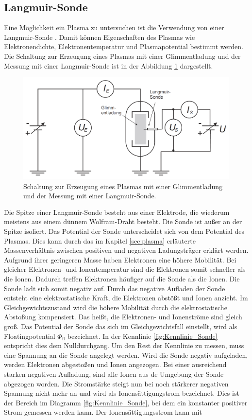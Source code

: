 \subsection{Langmuir-Sonde}\label{sec:Langmuir_Sonde}  
Eine Möglichkeit ein Plasma zu untersuchen ist die Verwendung von einer Langmuir-Sonde \cite{anleitung}. Damit können Eigenschaften des Plasmas wie Elektronendichte, Elektronentemperatur und Plasmapotential bestimmt werden. Die Schaltung zur Erzeugung eines Plasmas mit einer Glimmentladung und der Messung mit einer Langmuir-Sonde ist in der Abbildung \ref{fig:Schaltung_Sonde} dargestellt. 
\begin{figure}[H]
\centering
\includegraphics[scale=0.4]{Schaltung_Sonde.png}
\caption{Schaltung zur Erzeugung eines Plasmas mit einer Glimmentladung und der Messung mit einer Langmuir-Sonde. \cite{anleitung}}
\label{fig:Schaltung_Sonde}
\end{figure}
Die Spitze einer Langmuir-Sonde besteht aus einer Elektrode, die wiederum meistens aus einem dünnem Wolfram-Draht besteht. Die Sonde ist außer an der Spitze isoliert. Das Potential der Sonde unterscheidet sich von dem Potential des Plasmas. Dies kann durch das im Kapitel \ref{sec:plasma} erläuterte Massenverhältnis zwischen positiven und negativen Ladungsträger erklärt werden. Aufgrund ihrer geringeren Masse haben Elektronen eine höhere Mobilität. Bei gleicher Elektronen- und Ionentemperatur sind die Elektronen somit schneller als die Ionen. Dadurch treffen Elektronen häufiger auf die Sonde als die Ionen. Die Sonde lädt sich somit negativ auf. Durch das negative Aufladen der Sonde entsteht eine elektrostatische Kraft, die Elektronen abstößt und  Ionen anzieht. Im Gleichgewichtszustand wird die höhere Mobilität durch die elektrostatische Abstoßung kompensiert. Das heißt, die Elektronen- und Ionenströme sind gleich groß. Das Potential der Sonde das sich im Gleichgewichtsfall einstellt, wird als Floatingpotential $\Phi_{\mathrm{fl}}$ bezeichnet. In der Kennlinie \ref{fig:Kennlinie_Sonde} entspricht dies dem  Nulldurchgang.  Um den Rest der Kennlinie zu messen, muss eine Spannung an die Sonde angelegt werden. Wird die Sonde negativ aufgeladen, werden Elektronen abgestoßen und Ionen angezogen. Bei einer ausreichend starken negativen Aufladung, sind alle Ionen aus de Umgebung der Sonde abgezogen worden. Die Stromstärke steigt nun bei noch stärkerer negativen Spannung  nicht mehr an und wird als Ionensättigungstrom bezeichnet. Dies ist der Bereich im Diagramm \ref{fig:Kennlinie_Sonde}, bei dem ein konstanter positiver Strom gemessen werden kann. Der Ionensättigungsstrom kann mit
